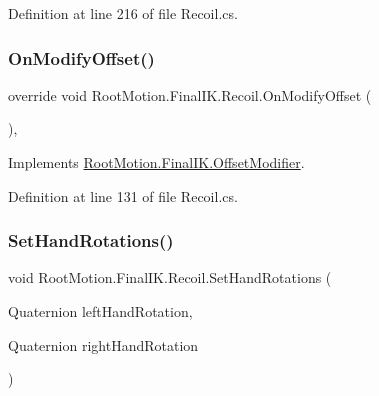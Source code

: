 Definition at line 216 of file Recoil.\+cs.

\mbox{\label{class_root_motion_1_1_final_i_k_1_1_recoil_ab90e5603561322c91818665cc301d38a}} 
\subsubsection{\texorpdfstring{On\+Modify\+Offset()}{OnModifyOffset()}}
{\footnotesize\ttfamily override void Root\+Motion.\+Final\+I\+K.\+Recoil.\+On\+Modify\+Offset (\begin{DoxyParamCaption}{ }\end{DoxyParamCaption})\hspace{0.3cm}{\ttfamily [protected]}, {\ttfamily [virtual]}}



Implements \mbox{\hyperlink{class_root_motion_1_1_final_i_k_1_1_offset_modifier_a777e9ffb4afca3d8647959a79a1120bb}{Root\+Motion.\+Final\+I\+K.\+Offset\+Modifier}}.



Definition at line 131 of file Recoil.\+cs.

\mbox{\label{class_root_motion_1_1_final_i_k_1_1_recoil_a02336cefad9092ec568706630414fd23}} 
\subsubsection{\texorpdfstring{Set\+Hand\+Rotations()}{SetHandRotations()}}
{\footnotesize\ttfamily void Root\+Motion.\+Final\+I\+K.\+Recoil.\+Set\+Hand\+Rotations (\begin{DoxyParamCaption}\item[{Quaternion}]{left\+Hand\+Rotation,  }\item[{Quaternion}]{right\+Hand\+Rotation }\end{DoxyParamCaption})}



